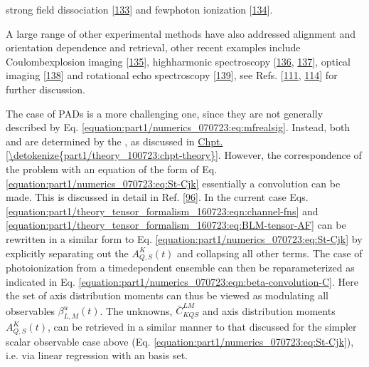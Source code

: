 \documentclass[letterpaper,table,10pt,english]{jupyterBook}
\begin{document}
strong field dissociation {[}\hyperlink{cite.backmatter/bibliography:id1000}{133}{]} and few\sphinxhyphen{}photon ionization {[}\hyperlink{cite.backmatter/bibliography:id999}{134}{]}.%
\begin{footnote}[2]\sphinxAtStartFootnote
A large range of other experimental methods have also addressed alignment and orientation dependence and retrieval, other recent examples include Coulomb\sphinxhyphen{}explosion imaging {[}\hyperlink{cite.backmatter/bibliography:id939}{135}{]}, high\sphinxhyphen{}harmonic spectroscopy {[}\hyperlink{cite.backmatter/bibliography:id646}{136}, \hyperlink{cite.backmatter/bibliography:id647}{137}{]}, optical imaging {[}\hyperlink{cite.backmatter/bibliography:id760}{138}{]} and rotational echo spectroscopy {[}\hyperlink{cite.backmatter/bibliography:id953}{139}{]}, see Refs. {[}\hyperlink{cite.backmatter/bibliography:id728}{111}, \hyperlink{cite.backmatter/bibliography:id836}{114}{]} for further discussion.
%
\end{footnote}

\sphinxAtStartPar
The case of PADs is a more challenging one, since they are not generally described by Eq. \eqref{equation:part1/numerics_070723:eq:mfrealsig}. Instead, both {\hyperref[\detokenize{backmatter/glossary:term-AF}]{}} and {\hyperref[\detokenize{backmatter/glossary:term-MF}]{}} are determined by the {\hyperref[\detokenize{backmatter/glossary:term-radial-matrix-elements}]{}}, as discussed in \hyperref[\detokenize{part1/theory_100723:chpt-theory}]{Chpt.\@ \ref{\detokenize{part1/theory_100723:chpt-theory}}}. However, the correspondence of the problem with an equation of the form of Eq. \eqref{equation:part1/numerics_070723:eq:St-Cjk} \sphinxhyphen{} essentially a convolution \sphinxhyphen{} can be made. This is discussed in detail in Ref. {[}\hyperlink{cite.backmatter/bibliography:id937}{96}{]}. In the current case Eqs. \eqref{equation:part1/theory_tensor_formalism_160723:eqn:channel-fns} and \eqref{equation:part1/theory_tensor_formalism_160723:eq:BLM-tensor-AF} can be rewritten in a similar form to Eq. \eqref{equation:part1/numerics_070723:eq:St-Cjk} by explicitly separating out the {\hyperref[\detokenize{backmatter/glossary:term-ADMs}]{}} \(A_{Q,S}^{K}(t)\) and collapsing all other terms. The case of photoionization from a time\sphinxhyphen{}dependent ensemble can then be reparameterized as indicated in Eq. \eqref{equation:part1/numerics_070723:eqn:beta-convolution-C}. Here the set of axis distribution moments can thus be viewed as modulating all observables \(\beta_{L,M}^{u}(t)\). The unknowns, \(\bar{C}_{KQS}^{LM}\) and axis distribution moments \(A_{Q,S}^{K}(t)\), can be retrieved in a similar manner to that discussed for the simpler scalar observable case above (Eq. \eqref{equation:part1/numerics_070723:eq:St-Cjk}), i.e. via linear regression with an {\hyperref[\detokenize{backmatter/glossary:term-RWP}]{}} basis set.
\end{document}
